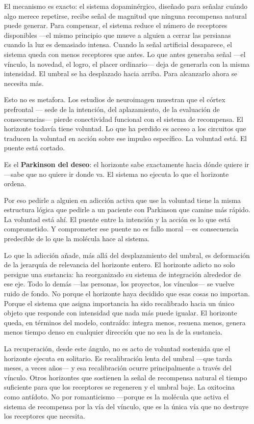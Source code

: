El mecanismo es exacto: el sistema dopaminérgico, diseñado para señalar cuándo algo merece repetirse, recibe señal de magnitud que ninguna recompensa natural puede generar. Para compensar, el sistema reduce el número de receptores disponibles —el mismo principio que mueve a alguien a cerrar las persianas cuando la luz es demasiado intensa. Cuando la señal artificial desaparece, el sistema queda con menos receptores que antes. Lo que antes generaba señal —el vínculo, la novedad, el logro, el placer ordinario— deja de generarla con la misma intensidad. El umbral se ha desplazado hacia arriba. Para alcanzarlo ahora se necesita más.

Esto no es metafora. Los estudios de neuroimagen muestran que el córtex prefrontal — sede de la intención, del aplazamiento, de la evaluación de consecuencias— pierde conectividad funcional con el sistema de recompensa. El horizonte todavía tiene voluntad. Lo que ha perdido es acceso a los circuitos que traducen la voluntad en acción sobre ese impulso específico. La voluntad está. El puente está cortado.

Es el \textbf{Parkinson del deseo}: el horizonte sabe exactamente hacia dónde quiere ir —sabe que no quiere ir donde va. El sistema no ejecuta lo que el horizonte ordena.

Por eso pedirle a alguien en adicción activa que use la voluntad tiene la misma estructura lógica que pedirle a un paciente con Parkinson que camine más rápido. La voluntad está ahí. El puente entre la intención y la acción es lo que está comprometido. Y comprometer ese puente no es fallo moral —es consecuencia predecible de lo que la molécula hace al sistema.

Lo que la adicción añade, más allá del desplazamiento del umbral, es deformación de la jerarquía de relevancia del horizonte entero. El horizonte adicto no solo persigue una sustancia: ha reorganizado su sistema de integración alrededor de ese eje. Todo lo demás —las personas, los proyectos, los vínculos— se vuelve ruido de fondo. No porque el horizonte haya decidido que esas cosas no importan. Porque el sistema que asigna importancia ha sido recalibrado hacia un único objeto que responde con intensidad que nada más puede igualar. El horizonte queda, en términos del modelo, contraído: integra menos, resuena menos, genera menos tiempo denso en cualquier dirección que no sea la de la sustancia.

La recuperación, desde este ángulo, no es acto de voluntad sostenida que el horizonte ejecuta en solitario. Es recalibración lenta del umbral —que tarda meses, a veces años— y esa recalibración ocurre principalmente a través del vínculo. Otros horizontes que sostienen la señal de recompensa natural el tiempo suficiente para que los receptores se regeneren y el umbral baje. La oxitocina como antídoto. No por romanticismo —porque es la molécula que activa el sistema de recompensa por la vía del vínculo, que es la única vía que no destruye los receptores que necesita.

